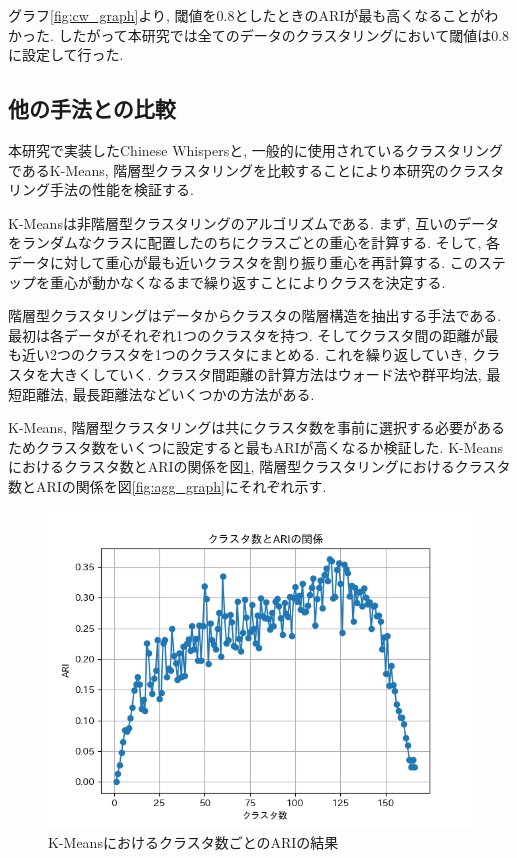 グラフ\ref{fig:cw_graph}より, 閾値を0.8としたときのARIが最も高くなることがわかった. したがって本研究では全てのデータのクラスタリングにおいて閾値は0.8に設定して行った. 

\subsection{他の手法との比較}
本研究で実装したChinese Whispersと, 一般的に使用されているクラスタリングであるK-Means, 階層型クラスタリングを比較することにより本研究のクラスタリング手法の性能を検証する. 

K-Meansは非階層型クラスタリングのアルゴリズムである. まず, 互いのデータをランダムなクラスに配置したのちにクラスごとの重心を計算する. そして, 各データに対して重心が最も近いクラスタを割り振り重心を再計算する. このステップを重心が動かなくなるまで繰り返すことによりクラスを決定する.

階層型クラスタリングはデータからクラスタの階層構造を抽出する手法である. 最初は各データがそれぞれ1つのクラスタを持つ. そしてクラスタ間の距離が最も近い2つのクラスタを1つのクラスタにまとめる. これを繰り返していき, クラスタを大きくしていく. クラスタ間距離の計算方法はウォード法や群平均法, 最短距離法, 最長距離法などいくつかの方法がある. 

K-Means, 階層型クラスタリングは共にクラスタ数を事前に選択する必要があるためクラスタ数をいくつに設定すると最もARIが高くなるか検証した. 
K-Meansにおけるクラスタ数とARIの関係を図\ref{fig:kmeans_graph}, 階層型クラスタリングにおけるクラスタ数とARIの関係を図\ref{fig:agg_graph}にそれぞれ示す.

\begin{figure}[hbtp]
  \centering
  \includegraphics[scale=0.8]
    {contents/images/kmeans_graph.png}
  \caption{K-Meansにおけるクラスタ数ごとのARIの結果\label{fig:kmeans_graph}}
\end{figure}

